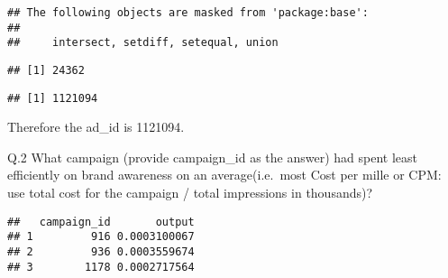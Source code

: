 \documentclass[
]{article}
\newenvironment{Shaded}{\begin{snugshade}}{\end{snugshade}}
\newcommand{\DecValTok}[1]{\textcolor[rgb]{0.00,0.00,0.81}{#1}}
\newcommand{\KeywordTok}[1]{\textcolor[rgb]{0.13,0.29,0.53}{\textbf{#1}}}
\newcommand{\NormalTok}[1]{#1}
\newcommand{\OperatorTok}[1]{\textcolor[rgb]{0.81,0.36,0.00}{\textbf{#1}}}
\newcommand{\StringTok}[1]{\textcolor[rgb]{0.31,0.60,0.02}{#1}}
\begin{document}
\begin{verbatim}
## The following objects are masked from 'package:base':
## 
##     intersect, setdiff, setequal, union
\end{verbatim}

\begin{Shaded}
\end{Shaded}

\begin{verbatim}
## [1] 24362
\end{verbatim}

\begin{Shaded}
\end{Shaded}

\begin{verbatim}
## [1] 1121094
\end{verbatim}

Therefore the ad\_id is 1121094.

Q.2 What campaign (provide campaign\_id as the answer) had spent least
efficiently on brand awareness on an average(i.e.~most Cost per mille or
CPM: use total cost for the campaign / total impressions in thousands)?

\begin{Shaded}
\end{Shaded}

\begin{verbatim}
##   campaign_id       output
## 1         916 0.0003100067
## 2         936 0.0003559674
## 3        1178 0.0002717564
\end{verbatim}
\end{document}
